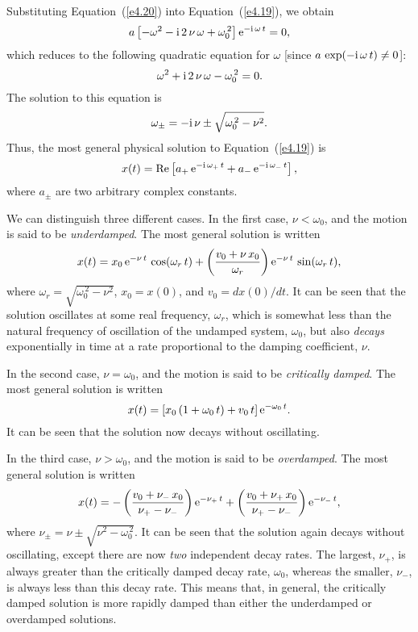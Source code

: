 Substituting Equation~(\ref{e4.20}) into Equation~(\ref{e4.19}), we obtain
\begin{equation}
a \left[-\omega^2-{\rm i}\,2\,\nu\,\omega + \omega_0^{\,2}\right]
{\rm e}^{-{\rm i}\,\omega\,t} = 0,
\end{equation}
which reduces to the following quadratic equation for $\omega$ [since $a\,\exp(-{\rm i}\,\omega\,t)\neq 0$]:
\begin{equation}
\omega^2 + {\rm i}\,2\,\nu\,\omega - \omega_0^{\,2} = 0.
\end{equation}
The solution to this equation is 
\begin{equation}
\omega_\pm = - {\rm i}\,\nu \pm \sqrt{\omega_0^{\,2}-\nu^2}.
\end{equation}
Thus, the most general physical solution to Equation~(\ref{e4.19}) is
\begin{equation}
x(t) = {\rm Re}\left[a_+\,{\rm e}^{-{\rm i}\,\omega_+\,t}
+ a_-\,{\rm e}^{-{\rm i}\,\omega_-\,t}\right],
\end{equation}
where $a_\pm$ are two arbitrary complex constants.

We can distinguish three different cases. In the first case, $\nu < \omega_0$, and the motion is said to be {\em underdamped}. The most general
solution is written
\begin{equation}\label{e4.47x}
x(t) = x_0\,{\rm e}^{-\nu\,t}\,\cos(\omega_r\,t) + \left(\frac{v_0+\nu\,x_0}{\omega_r}\right){\rm e}^{-\nu\,t}\,\sin(\omega_r\,t),
\end{equation}
where $\omega_r = \sqrt{\omega_0^{\,2}-\nu^2}$, $x_0 = x(0)$, and
$v_0 = dx(0)/dt$. It can be seen that the solution oscillates at some real
frequency, $\omega_r$, which is somewhat less than the natural frequency
of oscillation of the undamped system, $\omega_0$, but also {\em decays}
exponentially in time at a rate proportional to the damping coefficient, $\nu$. 

In the second case, $\nu=\omega_0$, and the motion is said to be {\em
critically damped}. The most general solution is written
\begin{equation}
x(t) = \left[x_0 \,(1+\omega_0\,t) + v_0\,t\right] {\rm e}^{-\omega_0\,t}.
\end{equation}
It can be seen that the solution now decays without oscillating. 

In the third case, $\nu>\omega_0$, and the motion is said to be {\em overdamped}. The most general solution is written
\begin{equation}
x(t) = -\left(\frac{v_0 + \nu_-\,x_0}{\nu_+-\nu_-}\right){\rm e}^{-\nu_+\,t}
+ \left(\frac{v_0+\nu_+\,x_0}{\nu_+-\nu_-}\right){\rm e}^{-\nu_-\,t},
\end{equation}
where $\nu_\pm = \nu\pm \sqrt{\nu^2-\omega_0^{\,2}}$. It can be seen
that the solution again decays without oscillating, except there are now
{\em two}\/ independent decay rates. The largest, $\nu_+$, is always greater than the
critically damped decay rate, $\omega_0$, whereas the smaller, $\nu_-$,
is always less than this decay rate. This means that, in general,
the critically damped solution is more rapidly damped than either 
the underdamped or  overdamped solutions.

